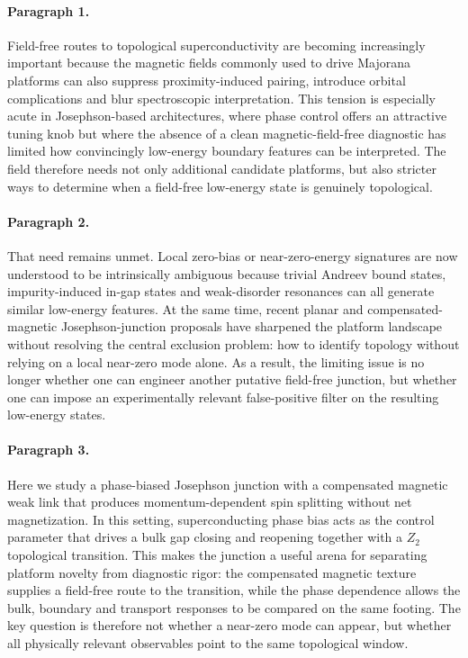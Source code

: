 \paragraph{Paragraph 1.}
Field-free routes to topological superconductivity are becoming increasingly important because the magnetic fields commonly used to drive Majorana platforms can also suppress proximity-induced pairing, introduce orbital complications and blur spectroscopic interpretation. This tension is especially acute in Josephson-based architectures, where phase control offers an attractive tuning knob but where the absence of a clean magnetic-field-free diagnostic has limited how convincingly low-energy boundary features can be interpreted. The field therefore needs not only additional candidate platforms, but also stricter ways to determine when a field-free low-energy state is genuinely topological.

\paragraph{Paragraph 2.}
That need remains unmet. Local zero-bias or near-zero-energy signatures are now understood to be intrinsically ambiguous because trivial Andreev bound states, impurity-induced in-gap states and weak-disorder resonances can all generate similar low-energy features. At the same time, recent planar and compensated-magnetic Josephson-junction proposals have sharpened the platform landscape without resolving the central exclusion problem: how to identify topology without relying on a local near-zero mode alone. As a result, the limiting issue is no longer whether one can engineer another putative field-free junction, but whether one can impose an experimentally relevant false-positive filter on the resulting low-energy states.

\paragraph{Paragraph 3.}
Here we study a phase-biased Josephson junction with a compensated magnetic weak link that produces momentum-dependent spin splitting without net magnetization. In this setting, superconducting phase bias acts as the control parameter that drives a bulk gap closing and reopening together with a $Z_2$ topological transition. This makes the junction a useful arena for separating platform novelty from diagnostic rigor: the compensated magnetic texture supplies a field-free route to the transition, while the phase dependence allows the bulk, boundary and transport responses to be compared on the same footing. The key question is therefore not whether a near-zero mode can appear, but whether all physically relevant observables point to the same topological window.

